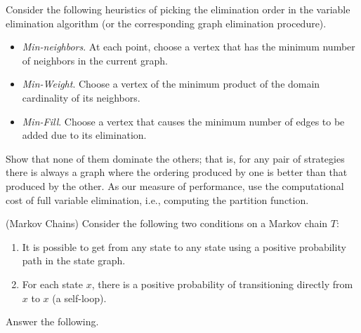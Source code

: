 \begin{questions}

  \newpage 
\bonusquestion[15] Consider the following heuristics of picking the
elimination order in the variable elimination algorithm (or the
corresponding graph elimination procedure). 

\begin{itemize}
\item \emph{Min-neighbors}. At each point, choose a vertex that has
  the minimum number of neighbors in the current graph. 
\item \emph{Min-Weight}. Choose a vertex of the minimum product of
  the domain cardinality of its neighbors.
\item \emph{Min-Fill}. Choose a vertex that causes the minimum number
  of edges to be added due to its elimination. 
\end{itemize}

Show that none of them dominate the others; that is, for any pair of
strategies there is always a graph where the ordering produced by one
is better than that produced by the other. As our measure of
performance, use the computational cost of full variable elimination,
i.e., computing the partition function.  

  \newpage

  \question (Markov Chains) Consider the following two conditions on a
  Markov chain $T$:

  \begin{enumerate}[label={\Roman*}.]
  \item It is possible to get from any state to any state using a
    positive probability path in the state graph.

  \item For each state $x$, there is a positive probability of
    transitioning directly from $x$ to $x$ (a self-loop).
  \end{enumerate}
Answer the following. 
  

\end{questions}
